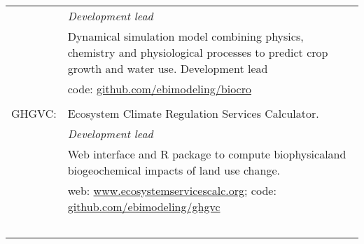 \documentclass[a4paper,10pt]{article}
\begin{document}
\begin{tabular}{rp{11cm}}
& \small \textit{Development lead}\\
& \small Dynamical simulation model combining physics, chemistry and physiological processes to predict crop growth and water use. Development lead\\
&\small code: \href{https://github.com/ebimodeling/biocro}{github.com/ebimodeling/biocro}\\
\multicolumn{2}{c}{} \\
GHGVC:& Ecosystem Climate Regulation Services Calculator.\\
& \small \textit{Development lead}\\
& \footnotesize Web interface and R package to compute biophysicaland biogeochemical impacts of land use change.\\
& \small web: \href{https://www.ecosystemservicescalc.org}{www.ecosystemservicescalc.org}; code: \href{https://github.com/ebimodeling/ghgvc}{github.com/ebimodeling/ghgvc}%
\\\

\end{tabular}





\end{document}
